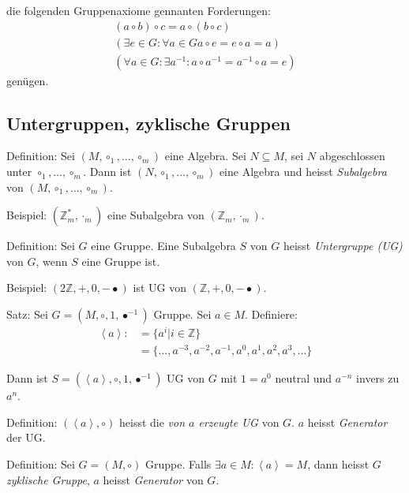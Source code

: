 \documentclass[a4paper, ngerman, landscape, fleqn]{article}
\begin{document}
\begin{multicols*}{3}
die folgenden Gruppenaxiome gennanten Forderungen:
\begin{align*}
    (a \circ b) \circ c = a \circ (b \circ c) \\
    (\exists e \in G : \forall a \in G a \circ e = e \circ a = a) \\
    (\forall a \in G : \exists a^{-1} : a \circ a^{-1} = a^{-1} \circ a = e)
\end{align*}
genügen.

\subsection*{Untergruppen, zyklische Gruppen}
Definition: Sei $(M, \circ_1, \dotsc, \circ_m)$ eine Algebra. Sei $N \subseteq M$, sei $N$ abgeschlossen unter $\circ_1, \dotsc, \circ_m$. Dann ist $(N, \circ_1, \dotsc, \circ_m)$ eine Algebra und heisst \emph{Subalgebra} von $(M, \circ_1, \dotsc, \circ_m)$.

Beispiel: $(\mathbb{Z}^*_m, \cdot_m)$ eine Subalgebra von $(\mathbb{Z}_m, \cdot_m)$.

Definition: Sei $G$ eine Gruppe. Eine Subalgebra $S$ von $G$ heisst \emph{Untergruppe (UG)} von $G$, wenn $S$ eine Gruppe ist.

Beispiel: $(2\mathbb{Z}, +, 0, -\bullet)$ ist UG von $(\mathbb{Z}, +, 0, -\bullet)$.

Satz: Sei $G = (M, \circ, 1, \bullet^{-1})$ Gruppe. Sei $a \in M$.
Definiere:
\begin{align*}
    \left< a \right> :&= \{ a^i | i \in \mathbb{Z} \} \\
                      &= \{ \dotsc, a^{-3}, a^{-2}, a^{-1}, a^{0}, a^1, a^2, a^3, \dotsc \}
\end{align*}

Dann ist $S = (\left< a \right>, \circ, 1, \bullet^{-1})$ UG von $G$ mit $1 = a^0$ neutral und $a^{-n}$ invers zu $a^n$.

Definition: $(\left<a\right>, \circ)$ heisst die \emph{von $a$ erzeugte UG} von $G$. $a$ heisst \emph{Generator} der UG.

Definition: Sei $G = (M, \circ)$ Gruppe. Falls $\exists a \in M : \left<a\right> = M$, dann heisst $G$ \emph{zyklische Gruppe}, $a$ heisst \emph{Generator} von $G$.


\end{multicols*}
\end{document}
